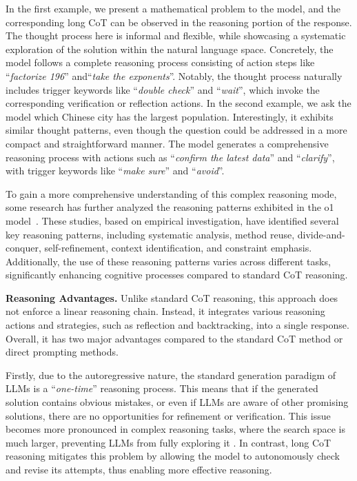 In the first example, we present a mathematical problem to the model, and the corresponding long CoT can be observed in the reasoning portion of the response. The thought process here is informal and flexible, while showcasing a systematic exploration of the solution within the natural language space. Concretely, the model follows a complete reasoning process consisting of action steps like ``\emph{factorize 196}'' and``\emph{take the exponents}''. Notably, the thought process naturally includes trigger keywords like ``\emph{double check}'' and ``\emph{wait}'', which invoke the corresponding verification or reflection actions. In the second example, we ask the model which Chinese city has the largest population. Interestingly, it exhibits similar thought patterns, even though the question could be addressed in a more compact and straightforward manner. The model generates a comprehensive reasoning process with actions such as ``\emph{confirm the latest data}'' and ``\emph{clarify}'', with trigger keywords like ``\emph{make sure}'' and ``\emph{avoid}''.  

To gain a more comprehensive understanding of this complex reasoning mode, some research has further analyzed the reasoning patterns exhibited in the o1 model~\cite{wu-2024-comparative-arxiv}. These studies, based on empirical investigation, have identified several key reasoning patterns, including systematic analysis, method reuse, divide-and-conquer, self-refinement, context identification, and constraint emphasis. Additionally, the use of these reasoning patterns varies across different tasks, significantly enhancing cognitive processes compared to standard CoT reasoning.

\textbf{Reasoning Advantages.} Unlike standard CoT reasoning, this approach does not enforce a linear reasoning chain. Instead, it integrates various reasoning actions and strategies, such as reflection and backtracking, into a single response. Overall, it has two major advantages compared to the standard CoT method or direct prompting methods.

Firstly, due to the autoregressive nature, the standard generation paradigm of LLMs is a ``\emph{one-time}'' reasoning process. This means that if the generated solution contains obvious mistakes, or even if LLMs are aware of other promising solutions, there are no opportunities for refinement or verification. This issue becomes more pronounced in complex reasoning tasks, where the search space is much larger, preventing LLMs from fully exploring it \cite{zhong-2024-evaluation-arxiv}. In contrast, long CoT reasoning mitigates this problem by allowing the model to autonomously check and revise its attempts, thus enabling more effective reasoning.

